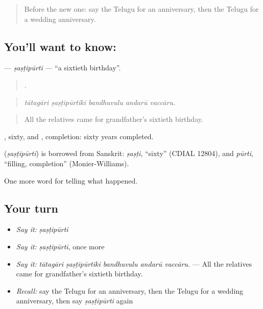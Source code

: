 \label{lesson:TE-C355-sastipurti}



\begin{quote}
Before the new one: say the Telugu for an anniversary, then the Telugu for a wedding anniversary.
\end{quote}

\subsection*{You'll want to know: }
\textbf{} — \emph{ṣaṣṭipūrti} — \textquotedblleft{}a sixtieth birthday\textquotedblright{}.

\begin{quote}
    .
\end{quote}

\begin{quote}
\emph{tātagāri ṣaṣṭipūrtiki bandhuvulu andarū vaccāru.}
\end{quote}

\begin{quote}
All the relatives came for grandfather's sixtieth birthday.
\end{quote}

, sixty, and , completion: sixty years completed.

\begin{cousinweb}
\textbf{} (\emph{ṣaṣṭipūrti}) is borrowed from Sanskrit: \emph{ṣaṣṭi}, \textquotedblleft{}sixty\textquotedblright{} (CDIAL 12804), and \emph{pūrti}, \textquotedblleft{}filling, completion\textquotedblright{} (Monier-Williams).
\end{cousinweb}

\begin{grammarlens}[title={What you've built}]
One more word for telling what happened.
\end{grammarlens}

\subsection*{Your turn}
\begin{itemize}
\raggedright
  \item \emph{Say it:} \emph{ṣaṣṭipūrti}
  \item \emph{Say it:} \emph{ṣaṣṭipūrti}, once more
  \item \emph{Say it:} \emph{tātagāri ṣaṣṭipūrtiki bandhuvulu andarū vaccāru.} — All the relatives came for grandfather's sixtieth birthday.
  \item \emph{Recall:} say the Telugu for an anniversary, then the Telugu for a wedding anniversary, then say \emph{ṣaṣṭipūrti} again
\end{itemize}

